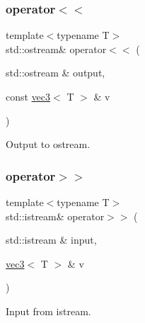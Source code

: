 \subsubsection{\texorpdfstring{operator$<$$<$}{operator<<}\hspace{0.1cm}{\footnotesize\ttfamily [4/4]}}
{\footnotesize\ttfamily template$<$typename T$>$ \\
std\+::ostream\& operator$<$$<$ (\begin{DoxyParamCaption}\item[{std\+::ostream \&}]{output,  }\item[{const \mbox{\hyperlink{struct_space_h_1_1vec3}{vec3}}$<$ T $>$ \&}]{v }\end{DoxyParamCaption})\hspace{0.3cm}{\ttfamily [friend]}}



Output to ostream. 

\mbox{\label{struct_space_h_1_1vec3_a72f92578884bd68e0747871acd8545fd}} 
\subsubsection{\texorpdfstring{operator$>$$>$}{operator>>}\hspace{0.1cm}{\footnotesize\ttfamily [1/4]}}
{\footnotesize\ttfamily template$<$typename T$>$ \\
std\+::istream\& operator$>$$>$ (\begin{DoxyParamCaption}\item[{std\+::istream \&}]{input,  }\item[{\mbox{\hyperlink{struct_space_h_1_1vec3}{vec3}}$<$ T $>$ \&}]{v }\end{DoxyParamCaption})\hspace{0.3cm}{\ttfamily [friend]}}



Input from istream. 

\mbox{\label{struct_space_h_1_1vec3_a72f92578884bd68e0747871acd8545fd}} 
